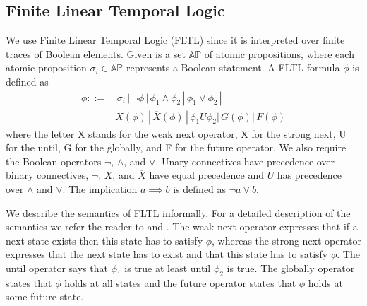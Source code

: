 \subsection{Finite Linear Temporal Logic} 
We use Finite Linear Temporal Logic (FLTL) since it is interpreted over finite traces of Boolean elements.
Given is a set $\mathbb{AP}$ of atomic propositions, where each atomic proposition $\sigma_i \in \mathbb{AP}$ represents a Boolean statement. A FLTL formula $\phi$ is defined as
\begin{align*}
\phi ::= & \, \sigma_i \,|\, \neg \phi \,|\, \phi_1 \land \phi_2 \,|\, \phi_1 \lor \phi_2 \,|\,\\
& X(\phi) \,|\, \overline{X}(\phi) \,|\, \phi_1 U \phi_2 |\, G(\phi) |\, F(\phi)
\end{align*}
where the letter X stands for the weak next operator, $\overline{\text{X}}$ for the strong next, U for the until, G for the globally, and F for the future operator. We also require the Boolean operators $\neg$, $\land$, and $\lor$. Unary connectives have precedence over binary connectives, $\neg$, $X$, and $\overline{X}$ have equal precedence and $U$ has precedence over $\land$ and $\lor$. The implication $a \implies b$ is defined as $\neg a \lor b$. 

We describe the semantics of FLTL informally. For a detailed description of the semantics we refer the reader to \cite{Manna1995} and \cite{Bauer2010}. The weak next operator expresses that if a next state exists then this state has to satisfy $\phi$, whereas the strong next operator expresses that the next state has to exist and that this state has to satisfy $\phi$. The until operator says that $\phi_1$ is true at least until $\phi_2$ is true. The globally operator states that $\phi$ holds at all states and the future operator states that $\phi$ holds at some future state.

